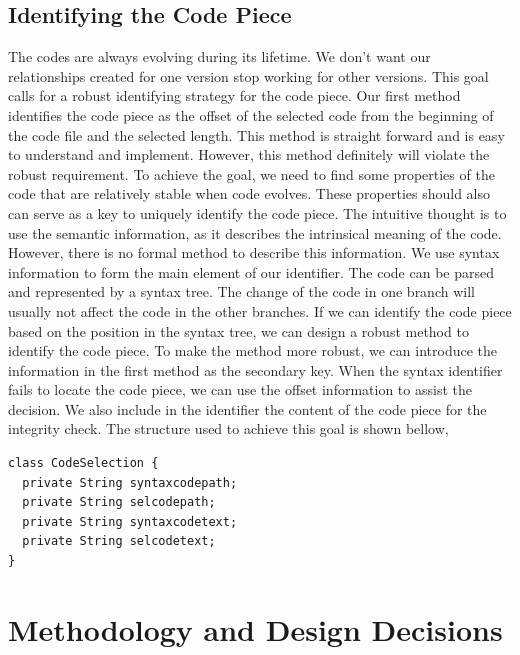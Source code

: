 \documentclass[11pt,letterpaper,oneside]{article}
\begin{document}
\subsection{Identifying the Code Piece}
The codes are always evolving during its lifetime.
We don't want our relationships created for one version stop working for other versions.
This goal calls for a robust identifying strategy for the code piece.
Our first method identifies the code piece as the offset of the selected code from the beginning of the code file and the selected length.
This method is straight forward and is easy to understand and implement.
However, this method definitely will violate the robust requirement.
To achieve the goal, we need to find some properties of the code that are relatively stable when code evolves.
These properties should also can serve as a key to uniquely identify the code piece.
The intuitive thought is to use the semantic information,
as it describes the intrinsical meaning of the code.
However, there is no formal method to describe this information.
We use syntax information to form the main element of our identifier.
The code can be parsed and represented by a syntax tree.
The change of the code in one branch will usually not affect the code in the other branches.
If we can identify the code piece based on the position in the syntax tree,
we can design a robust method to identify the code piece.
To make the method more robust,
we can introduce the information in the first method as the secondary key.
When the syntax identifier fails to locate the code piece,
we can use the offset information to assist the decision.
We also include in the identifier the content of the code piece for the integrity check.
The structure used to achieve this goal is shown bellow,
\begin{Verbatim}[frame=single]
class CodeSelection {
  private String syntaxcodepath;
  private String selcodepath;
  private String syntaxcodetext;
  private String selcodetext;
}
\end{Verbatim}


\section{Methodology and Design Decisions}
\label{sec:decision}
\end{document}
